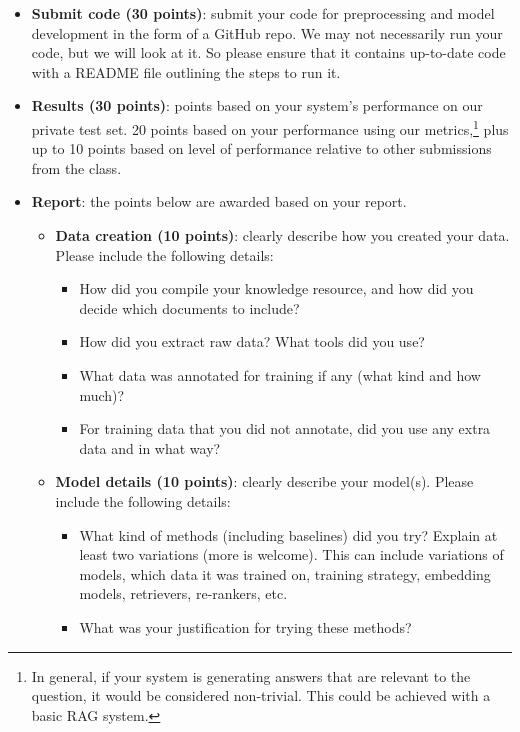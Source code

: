 \documentclass[11pt]{article}
\begin{document}
\begin{itemize}[leftmargin=2em]
  \item \textbf{Submit code (30 points)}: submit your code for preprocessing and model development in
    the form of a GitHub repo. We may not necessarily run your code, but we will look at it. So please
    ensure that it contains up-to-date code with a README file outlining the steps to run it.
  \item \textbf{Results (30 points)}: points based on your system's performance on our private test
    set. 20 points based on your performance using our metrics,\footnote{In general, if your system is
    generating answers that are relevant to the question, it would be considered non-trivial. This
    could be achieved with a basic RAG system.} plus up to 10 points based on level of performance
    relative to other submissions from the class.
  \item \textbf{Report}: the points below are awarded based on your report.
    \begin{itemize}[leftmargin=1.6em]
      \item \textbf{Data creation (10 points)}: clearly describe how you created your data. Please
        include the following details:
        \begin{itemize}[nosep, leftmargin=1.4em]
          \item How did you compile your knowledge resource, and how did you decide which documents to
            include?
          \item How did you extract raw data? What tools did you use?
          \item What data was annotated for training if any (what kind and how much)?
          \item For training data that you did not annotate, did you use any extra data and in what
            way?
        \end{itemize}
      \item \textbf{Model details (10 points)}: clearly describe your model(s). Please include the
        following details:
        \begin{itemize}[nosep, leftmargin=1.4em]
          \item What kind of methods (including baselines) did you try? Explain at least two
            variations (more is welcome). This can include variations of models, which data it was
            trained on, training strategy, embedding models, retrievers, re-rankers, etc.
          \item What was your justification for trying these methods?

\end{itemize}
\end{itemize}
\end{itemize}
\end{document}
